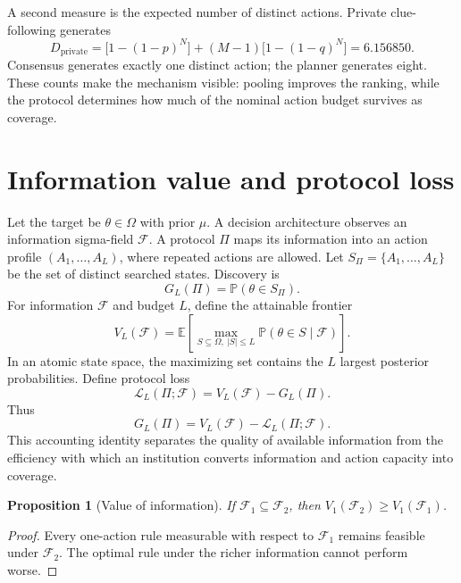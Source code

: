 \documentclass[11pt]{article}
\newtheorem{proposition}{Proposition}
\theoremstyle{definition}
\theoremstyle{remark}
\newcommand{\E}{\mathbb{E}}
\newcommand{\Prob}{\mathbb{P}}
\newcommand{\1}{\mathbf{1}}
\newcommand{\F}{\mathcal{F}}
\newcommand{\Loss}{\mathcal{L}}
\newcommand{\priv}{\mathrm{private}}
\begin{document}
A second measure is the expected number of distinct actions. Private clue-following generates
\begin{equation}
D_{\priv}
=\bigl[1-(1-p)^N\bigr]+(M-1)\bigl[1-(1-q)^N\bigr]
=6.156850.
\label{eq:distinct-private}
\end{equation}
Consensus generates exactly one distinct action; the planner generates eight. These counts make the mechanism visible: pooling improves the ranking, while the protocol determines how much of the nominal action budget survives as coverage.

\section{Information value and protocol loss}
\label{sec:framework}

Let the target be $\theta\in\Omega$ with prior $\mu$. A decision architecture observes an information sigma-field $\F$. A protocol $\Pi$ maps its information into an action profile $(A_1,\ldots,A_L)$, where repeated actions are allowed. Let $S_\Pi=\{A_1,\ldots,A_L\}$ be the set of distinct searched states. Discovery is
\[
G_L(\Pi)=\Prob(\theta\in S_\Pi).
\]
For information $\F$ and budget $L$, define the attainable frontier
\begin{equation}
V_L(\F)=\E\left[\max_{S\subseteq\Omega,\ |S|\le L}
\Prob(\theta\in S\mid\F)\right].
\label{eq:frontier-general}
\end{equation}
In an atomic state space, the maximizing set contains the $L$ largest posterior probabilities. Define protocol loss
\begin{equation}
\Loss_L(\Pi;\F)=V_L(\F)-G_L(\Pi).
\label{eq:protocol-loss}
\end{equation}
Thus
\[
G_L(\Pi)=V_L(\F)-\Loss_L(\Pi;\F).
\]
This accounting identity separates the quality of available information from the efficiency with which an institution converts information and action capacity into coverage.

\begin{proposition}[Value of information]
\label{prop:voi}
If $\F_1\subseteq\F_2$, then $V_1(\F_2)\ge V_1(\F_1)$.
\end{proposition}

\begin{proof}
Every one-action rule measurable with respect to $\F_1$ remains feasible under $\F_2$. The optimal rule under the richer information cannot perform worse.
\end{proof}
\end{document}
